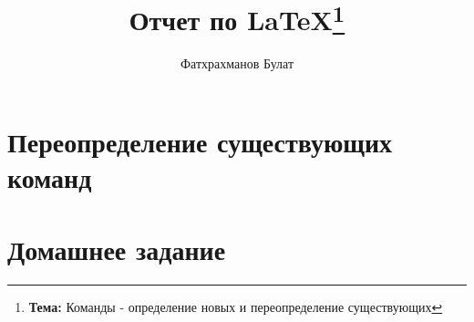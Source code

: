 \documentclass{report}
\author{Фатхрахманов Булат}
\title{Отчет по \LaTeX \thanks{{\bf Тема:} Команды - определение новых и переопределение существующих}}
\begin{document}
	\maketitle
	\tableofcontents
	\newpage
	
	
	\chapter{Переопределение существующих команд}
	\chapter{Домашнее задание}
\end{document}
